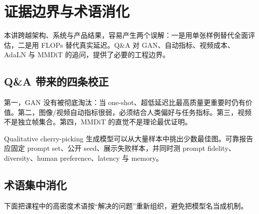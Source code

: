 \section{证据边界与术语消化}

本讲跨越架构、系统与产品结果，容易产生两个误解：一是用单张样例替代全面评估，二是用 FLOPs 替代真实延迟。Q\&A 对 GAN、自动指标、视频成本、AdaLN 与 MMDiT 的追问，提供了必要的工程边界。

\subsection{Q\&A 带来的四条校正}

第一，GAN 没有被彻底淘汰：当 one-shot、超低延迟比最高质量更重要时仍有价值。第二，图像/视频自动指标很弱，必须结合人类偏好与任务指标。第三，视频不是独立帧集合。第四，MMDiT 的直觉不是理论最优证明。



\begin{warningbox}{Qualitative cherry-picking}
生成模型可以从大量样本中挑出少数最佳图。可靠报告应固定 prompt set、公开 seed、展示失败样本，并同时测 prompt fidelity、diversity、human preference、latency 与 memory。
\end{warningbox}

\subsection{术语集中消化}

下面把课程中的高密度术语按“解决的问题”重新组织，避免把模型名当成机制。

